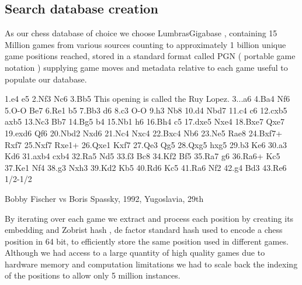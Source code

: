 \subsection{Search database creation}

As our chess database of choice we choose LumbrasGigabase \cite{retrieval:lumbrasgigabase}, containing 15 Million games from various sources counting
to approximately 1 billion unique game positions reached, stored in a standard format called PGN ( portable game notation ) \cite{chess:pgn} supplying 
game moves and metadata relative to each game useful to populate our database.
\newline

\begin{mdframed}
\newline
{}\newline
\string[Date "1992.11.04"]\string\newline
{}\newline
{}\newline
{}\newline
{}\newline
\newline
1.e4 e5 2.Nf3 Nc6 3.Bb5 {This opening is called the Ruy Lopez.} 3...a6
4.Ba4 Nf6 5.O-O Be7 6.Re1 b5 7.Bb3 d6 8.c3 O-O 9.h3 Nb8 10.d4 Nbd7
11.c4 c6 12.cxb5 axb5 13.Nc3 Bb7 14.Bg5 b4 15.Nb1 h6 16.Bh4 c5 17.dxe5
Nxe4 18.Bxe7 Qxe7 19.exd6 Qf6 20.Nbd2 Nxd6 21.Nc4 Nxc4 22.Bxc4 Nb6
23.Ne5 Rae8 24.Bxf7+ Rxf7 25.Nxf7 Rxe1+ 26.Qxe1 Kxf7 27.Qe3 Qg5 28.Qxg5
hxg5 29.b3 Ke6 30.a3 Kd6 31.axb4 cxb4 32.Ra5 Nd5 33.f3 Bc8 34.Kf2 Bf5
35.Ra7 g6 36.Ra6+ Kc5 37.Ke1 Nf4 38.g3 Nxh3 39.Kd2 Kb5 40.Rd6 Kc5 41.Ra6
Nf2 42.g4 Bd3 43.Re6 1/2-1/2
\end{mdframed}
\begin{center}
Bobby Fischer vs Boris Spassky, 1992, Yugoslavia, 29th
\end{center}
By iterating over each game we extract and process each position by creating its embedding and Zobrist hash \cite{retrieval:zobristhash}, de factor standard 
hash used to encode a chess position in 64 bit, to efficiently store the same position used in different games. 
\newline
Although we had access to a large quantity of high quality games due to hardware memory and computation limitations 
we had to scale back the indexing of the positions to allow only 5 million instances.

